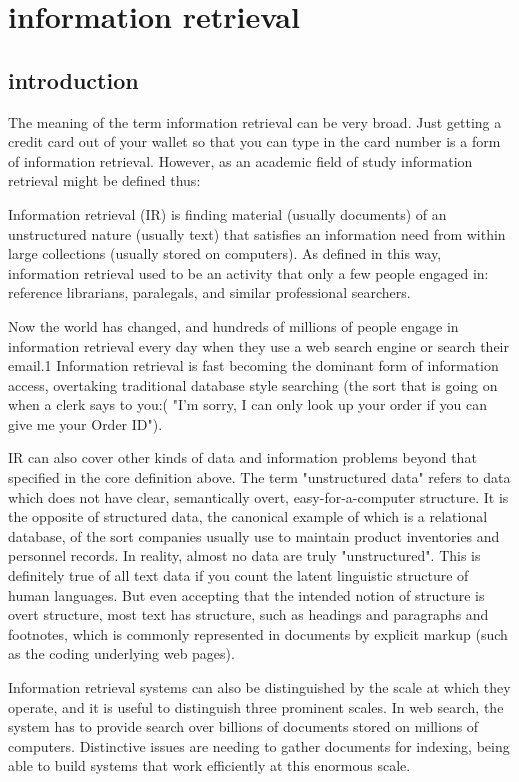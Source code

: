 \section{information retrieval}  

\subsection{introduction}


The meaning of the term information retrieval can be very broad. Just getting a credit card out of your wallet so that you can type in the card number is a form of information retrieval. However, as an academic field of study information retrieval might be defined thus: 

Information retrieval (IR) is finding material (usually documents) of an unstructured nature (usually text) that satisfies an information need from within large collections (usually stored on computers). As defined in this way, information retrieval used to be an activity that only a few people engaged in: reference librarians, paralegals, and similar professional searchers.

Now the world has changed, and hundreds of millions of people engage in information retrieval every day when they use a web search engine or search their email.1 Information retrieval is fast becoming the dominant form of information access, overtaking traditional database style searching (the sort that is going on when a clerk says to you:( "I'm sorry, I can only look up your order if you can give me your Order ID").
 
IR can also cover other kinds of data and information problems beyond that specified in the core definition above. The term "unstructured data" refers to data which does not have clear, semantically overt, easy-for-a-computer structure. It is the opposite of structured data, the canonical example of which is a relational database, of the sort companies usually use to maintain product inventories and personnel records. In reality, almost no data are truly "unstructured". This is definitely true of all text data if you count the latent linguistic structure of human languages. But even accepting that the intended notion of structure is overt structure, most text has structure, such as headings and paragraphs and footnotes, which is commonly represented in documents by explicit markup (such as the coding underlying web pages).

Information retrieval systems can also be distinguished by the scale at
which they operate, and it is useful to distinguish three prominent scales.
In web search, the system has to provide search over billions of documents
stored on millions of computers. Distinctive issues are needing to gather
documents for indexing, being able to build systems that work efficiently
at this enormous scale.




